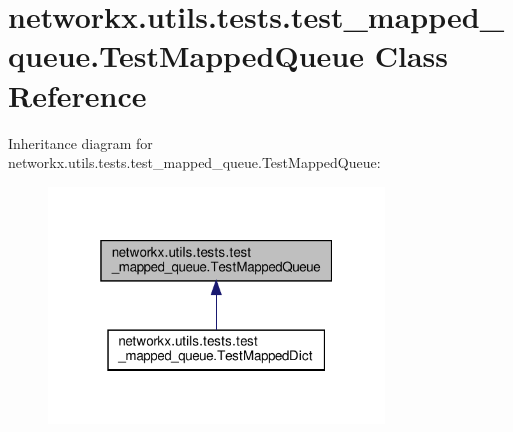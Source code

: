 \hypertarget{classnetworkx_1_1utils_1_1tests_1_1test__mapped__queue_1_1TestMappedQueue}{}\section{networkx.\+utils.\+tests.\+test\+\_\+mapped\+\_\+queue.\+Test\+Mapped\+Queue Class Reference}
\label{classnetworkx_1_1utils_1_1tests_1_1test__mapped__queue_1_1TestMappedQueue}


Inheritance diagram for networkx.\+utils.\+tests.\+test\+\_\+mapped\+\_\+queue.\+Test\+Mapped\+Queue\+:
\nopagebreak
\begin{figure}[H]
\begin{center}
\leavevmode
\includegraphics[width=253pt]{classnetworkx_1_1utils_1_1tests_1_1test__mapped__queue_1_1TestMappedQueue__inherit__graph}
\end{center}
\end{figure}
